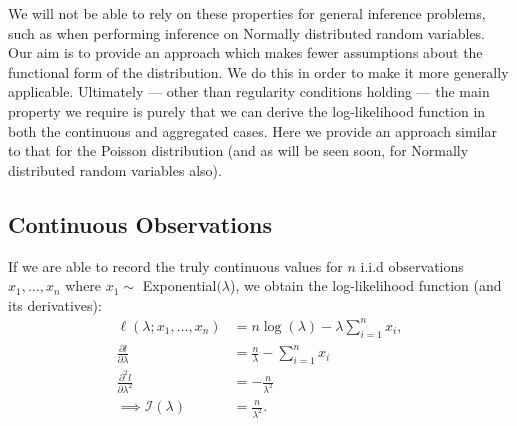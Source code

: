 \documentclass[11pt,a4,twosided,singlespacing,titlepagenumber=on,numbers=endperiod]{scrreprt}
\numberwithin{equation}{chapter} %
\theoremstyle{remark}
\begin{document}
We will not be able to rely on these properties for general inference problems, such as when performing inference on Normally distributed random variables. Our aim is to provide an approach which makes fewer assumptions about the functional form of the distribution. We do this in order to make it more generally applicable. Ultimately --- other than regularity conditions holding --- the main property we require is purely that we can derive the log-likelihood function in both the continuous and aggregated cases. Here we provide an approach similar to that for the Poisson distribution (and as will be seen soon, for Normally distributed random variables also).
\subsection{Continuous Observations}
If we are able to record the truly continuous values for $n$ i.i.d observations $x_1,\dots,x_n$ where $x_1 \sim$ Exponential$(\lambda$), we obtain the log-likelihood function (and its derivatives):
\begin{equation*}
	\begin{aligned}
		\ell(\lambda; x_1,\dots, x_n) &= n \log(\lambda) - \lambda \sum_{i=1}^n x_i, \\
		\frac{\partial l}{\partial \lambda} &= \frac{n}{\lambda} - \sum_{i=1}^n x_i \\
		\frac{\partial^2 l}{\partial \lambda^2} &= -\frac{n}{\lambda^2} \\
		\implies \mathcal{I}(\lambda) &= \frac{n}{\lambda^2}.
	\end{aligned}
\end{equation*}
\end{document}
